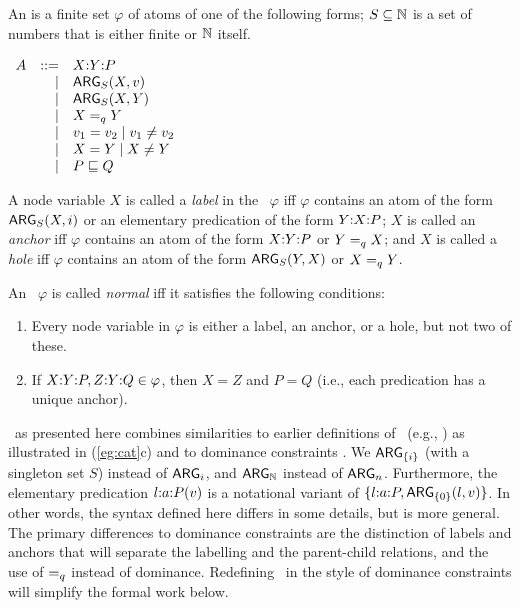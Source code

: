 \begin{definition}\label{defn:rmrs-syntax}
  An \emph{\rmrs} is a finite set $\varphi$ of atoms of one of the
  following forms; $S \subseteq \mathbb{N}$ is a set of numbers that is either
  finite or $\mathbb{N}$ itself.

$\begin{array}{rrll}
A &::= &\ep{X}{Y}{P} \\ %
&| &\ARG_S(X,v) \\ %
&| &\ARG_S(X,Y) \\ %
&| &X \qeq Y \\ %
&| &v_1 = v_2 \;|\; v_1 \neq v_2 \\ %
&| &X = Y \;|\; X \neq Y \\ %
&| &P \spec Q %
\end{array}
$

A node variable $X$ is called a \emph{label} in the \rmrs\
$\varphi$ iff $\varphi$ contains an atom of the form $\mathsf{ARG}_S(X,i)$ or
an elementary predication of the form $Y {:} X {:} P$; $X$ is called an
\emph{anchor} iff $\varphi$ contains an atom of the form
$X {:} Y {:} P$ or $Y =_q X$; and $X$ is called a \emph{hole} iff
$\varphi$ contains an atom of the form $\mathsf{ARG}_S(Y,X)$ or $X =_q Y$.

An \rmrs\ $\varphi$ is called \emph{normal} iff it satisfies the
following conditions:
\begin{enumerate}
\item Every node variable in $\varphi$ is either a label, an anchor,
  or a hole, but not two of these.
\item If $X {:} Y {:} P, Z {:} Y {:} Q\in \varphi$, then $X=Z$ and $P=Q$
  (i.e., each predication has a unique anchor).
\end{enumerate}
\end{definition}

\rmrs\ as presented here combines similarities to earlier definitions
of \rmrs\ (e.g., \cite{copestake:2003}) as illustrated in
(\ref{eg:cat}c) and
to dominance constraints
\cite{egg:etal:2001}.  We
$\mathsf{ARG}_{\{i\}}$ (with a singleton set $S$) instead of $\mathsf{ARG}_i$, and
$\mathsf{ARG}_{\mathbb{N}}$ instead of $\mathsf{ARG}_n$.  Furthermore, the
elementary predication $l {:} a {:} P(v)$ is a notational variant of
$\{l {:} a {:} P, \mathsf{ARG}_{\{0\}}(l,v)\}$.
In other words, the syntax defined
here differs in some details, but is more general. The primary
differences to dominance constraints are the distinction of labels and
anchors that will separate the
labelling and the parent-child relations, and
the use of $=_q$ instead of dominance.  Redefining
\rmrs\ in the
style of dominance constraints will simplify the formal work
below.

